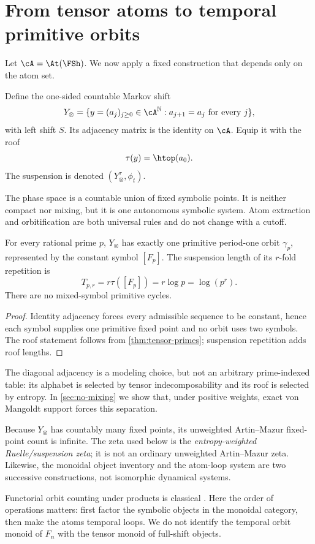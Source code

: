 \section{From tensor atoms to temporal primitive orbits}

Let $\cA=\At(\FSh)$.  We now apply a fixed construction that depends only on
the atom set.

\begin{definition}
\label{def:atom-shift}
Define the one-sided countable Markov shift
\[
  Y_\otimes=\{y=(a_j)_{j\geq0}\in\cA^{\mathbb N}:a_{j+1}=a_j
  \text{ for every }j\},
\]
with left shift $S$.  Its adjacency matrix is the identity on $\cA$.  Equip
it with the roof
\[
  \tau(y)=\htop(a_0).
\]
The suspension is denoted $(Y_\otimes^\tau,\phi_t)$.
\end{definition}

The phase space is a countable union of fixed symbolic points.  It is neither
compact nor mixing, but it is one autonomous symbolic system.  Atom
extraction and orbitification are both universal rules and do not change with
a cutoff.

\begin{theorem}
\label{thm:ledger}
For every rational prime $p$, $Y_\otimes$ has exactly one primitive
period-one orbit $\gamma_p$, represented by the constant symbol $[F_p]$.
The suspension length of its $r$-fold repetition is
\[
  T_{p,r}=r\tau([F_p])=r\log p=\log(p^r).
\]
There are no mixed-symbol primitive cycles.
\end{theorem}

\begin{proof}
Identity adjacency forces every admissible sequence to be constant, hence
each symbol supplies one primitive fixed point and no orbit uses two symbols.
The roof statement follows from \cref{thm:tensor-primes}; suspension
repetition adds roof lengths.
\end{proof}

The diagonal adjacency is a modeling choice, but not an arbitrary
prime-indexed table: its alphabet is selected by tensor indecomposability and
its roof is selected by entropy.  In \cref{sec:no-mixing} we show that, under
positive weights, exact von Mangoldt support forces this separation.

Because $Y_\otimes$ has countably many fixed points, its unweighted
Artin--Mazur fixed-point count is infinite.  The zeta used below is the
\emph{entropy-weighted Ruelle/suspension zeta}; it is not an ordinary
unweighted Artin--Mazur zeta.  Likewise, the monoidal object inventory and the
atom-loop system are two successive constructions, not isomorphic dynamical
systems.

Functorial orbit counting under products is classical
\citep{pakapongpunward2009}.  Here the order of operations matters: first
factor the symbolic objects in the monoidal category, then make the atoms
temporal loops.  We do not identify the temporal orbit monoid of $F_n$ with
the tensor monoid of full-shift objects.
